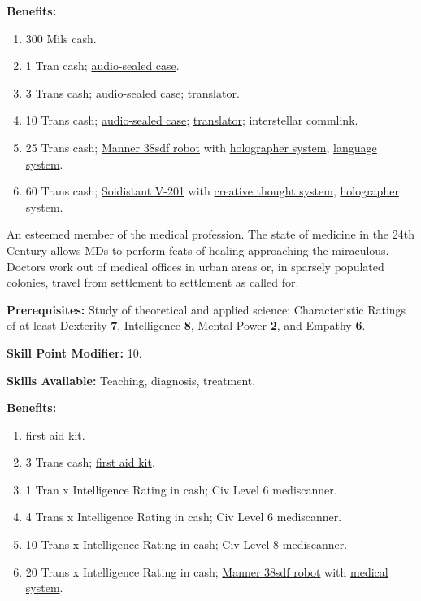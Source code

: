 \pagebreak[2]
\textbf{Benefits:}
\begin{enumerate}
\item 300 Mils cash.
\item 1 Tran cash; \hyperlink{tag:audio-sealed-case}{audio-sealed case}.
\item 3 Trans cash; \hyperlink{tag:audio-sealed-case}{audio-sealed case}; \hyperlink{tag:translator}{translator}.
\item 10 Trans cash; \hyperlink{tag:audio-sealed-case}{audio-sealed case}; \hyperlink{tag:translator}{translator}; interstellar
  commlink.
\item 25 Trans cash; \hyperlink{tag:bot-manner-38sdf}{Manner 38sdf robot} with \hyperlink{tag:bot-holographer}{holographer system},
  \hyperlink{tag:bot-language}{language system}.
\item 60 Trans cash; \hyperlink{tag:bot-soidistant-v-201}{Soidistant V-201} with \hyperlink{tag:bot-creative-thought}{creative thought system},
  \hyperlink{tag:bot-holographer}{holographer system}.
\end{enumerate}

\bigskip

\pagebreak[2]

\label{sec:prof-doctor}

An esteemed member of the medical profession. The state of medicine in
the 24th Century allows MDs to perform feats of healing approaching
the miraculous. Doctors work out of medical offices in urban areas or,
in sparsely populated colonies, travel from settlement to settlement
as called for.

\textbf{Prerequisites:} Study of theoretical and applied science;
   Characteristic Ratings of at least Dexterity  \textbf{7}, Intelligence  \textbf{8},
   Mental Power \textbf{2}, and Empathy  \textbf{6}.

\textbf{Skill Point Modifier:} 10.

\textbf{Skills Available:} Teaching, diagnosis, treatment.

\pagebreak[2]
\textbf{Benefits:}
\begin{enumerate}
\item \hyperlink{tag:first-aid-kit}{first aid kit}.
\item 3 Trans cash; \hyperlink{tag:first-aid-kit}{first aid kit}.
\item 1 Tran x Intelligence Rating in cash; \hypertarget{tag:cl6-mediscanner}{Civ Level 6 mediscanner}.
\item 4 Trans x Intelligence Rating in cash; \hypertarget{tag:cl6-mediscanner}{Civ Level 6 mediscanner}.
\item 10 Trans x Intelligence Rating in cash; \hypertarget{tag:cl8-mediscanner}{Civ Level 8 mediscanner}.
\item 20 Trans x Intelligence Rating in cash; 
\hyperlink{tag:bot-manner-38sdf}{Manner 38sdf robot} with \hyperlink{tag:bot-medical}{medical system}.

\end{enumerate}
\label{sec:prof-doctor-bot}

